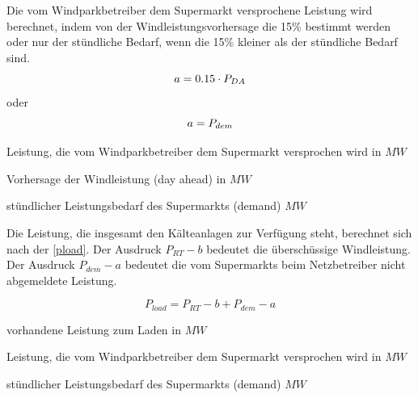 Die vom Windparkbetreiber dem Supermarkt versprochene Leistung wird berechnet,
indem von der Windleistungsvorhersage die 15\% bestimmt werden oder nur der
st\"undliche Bedarf, wenn die 15\% kleiner als der st\"undliche Bedarf sind.
\begin{equation*}
	a = 0.15 \cdot P_{DA}\\
\end{equation*}
oder
\begin{equation*}
	a = P_{dem}\\
	\label{b}
\end{equation*}

\begin{description}[\dth]
	\item[$a$] Leistung, die vom Windparkbetreiber dem Supermarkt
	versprochen wird in $MW$
	\item[$P_{DA}$] Vorhersage der Windleistung (day ahead) in $MW$
	\item[$P_{dem}$] st\"undlicher Leistungsbedarf des Supermarkts (demand)
	$MW$
\end{description} \vspace{0.5cm}

Die Leistung, die insgesamt den K\"alteanlagen zur Verf\"ugung steht, berechnet
sich nach der \cref{pload}. Der Ausdruck $P_{RT} - b$ bedeutet die
\"ubersch\"ussige Windleistung. Der Ausdruck $P_{dem} - a$  bedeutet die vom
Supermarkts beim Netzbetreiber nicht abgemeldete Leistung.

\begin{equation}
	P_{load} = P_{RT} - b + P_{dem} - a
	\label{pload}
\end{equation}
\begin{description}[\dth]
	\item[$P_{load}$] vorhandene Leistung zum Laden in $MW$
	\item[$a$] Leistung, die vom Windparkbetreiber dem Supermarkt
	versprochen wird in $MW$
	\item[$P_{dem}$] st\"undlicher Leistungsbedarf des Supermarkts (demand)
	$MW$
\end{description} \vspace{0.5cm}

